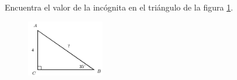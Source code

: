 Encuentra el valor de la incógnita en el triángulo de la figura \ref{fig:lados_functrig_06}.
\begin{figure}[H]
    \begin{center}
        \includegraphics[width=0.3\textwidth]{../images/lados_functrig_06.png}
    \end{center}
    \caption{}
    \label{fig:lados_functrig_06}
\end{figure}